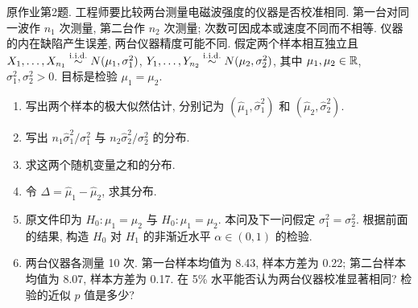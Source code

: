 \begin{exercise}\label{ps05:p02}
原作业第2题. 工程师要比较两台测量电磁波强度的仪器是否校准相同. 第一台对同一波作 $n_1$ 次测量, 第二台作 $n_2$ 次测量; 次数可因成本或速度不同而不相等. 仪器的内在缺陷产生误差, 两台仪器精度可能不同. 假定两个样本相互独立且
$X_1,\ldots,X_{n_1}\stackrel{\mathrm{i.i.d.}}{\sim} N(\mu_1,\sigma_1^2)$,
$Y_1,\ldots,Y_{n_2}\stackrel{\mathrm{i.i.d.}}{\sim} N(\mu_2,\sigma_2^2)$,
其中 $\mu_1,\mu_2\in\mathbb R$, $\sigma_1^2,\sigma_2^2>0$. 目标是检验 $\mu_1=\mu_2$.
\begin{enumerate}[label=\arabic*.]
\item 写出两个样本的极大似然估计, 分别记为 $(\hat\mu_1,\hat\sigma_1^2)$ 和 $(\hat\mu_2,\hat\sigma_2^2)$.
\item 写出 $n_1\hat\sigma_1^2/\sigma_1^2$ 与 $n_2\hat\sigma_2^2/\sigma_2^2$ 的分布.
\item 求这两个随机变量之和的分布.
\item 令 $\Delta=\hat\mu_1-\hat\mu_2$, 求其分布.
\item 原文件印为 $H_0:\mu_1=\mu_2$ 与 $H_0:\mu_1=\mu_2$. 本问及下一问假定 $\sigma_1^2=\sigma_2^2$. 根据前面的结果, 构造 $H_0$ 对 $H_1$ 的非渐近水平 $\alpha\in(0,1)$ 的检验.
\item 两台仪器各测量 10 次. 第一台样本均值为 8.43, 样本方差为 0.22; 第二台样本均值为 8.07, 样本方差为 0.17. 在 5\% 水平能否认为两台仪器校准显著相同? 检验的近似 $p$ 值是多少?
\end{enumerate}
\end{exercise}
